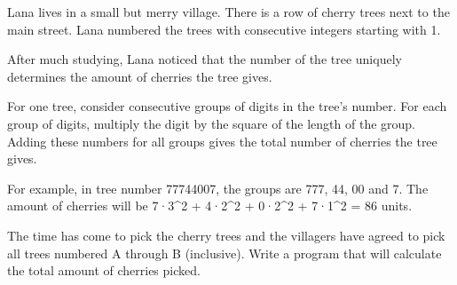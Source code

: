 Lana lives in a small but merry village. There is a row of cherry trees next to the main street. Lana numbered the trees with consecutive integers starting with 1.  

   After much studying, Lana noticed that the number of the tree uniquely determines the amount of cherries the tree gives.  

   For one tree, consider consecutive groups of digits in the tree's number. For each group of digits, multiply the digit by the square of the length of the group. Adding these numbers for all groups gives the total number of cherries the tree gives.  

   For example, in tree number 77744007, the groups are 777, 44, 00 and 7. The amount of cherries will be 7·3^2 + 4·2^2 + 0·2^2 + 7·1^2 = 86 units.  

   The time has come to pick the cherry trees and the villagers have agreed to pick all trees numbered A through B (inclusive). Write a program that will calculate the total amount of cherries picked.